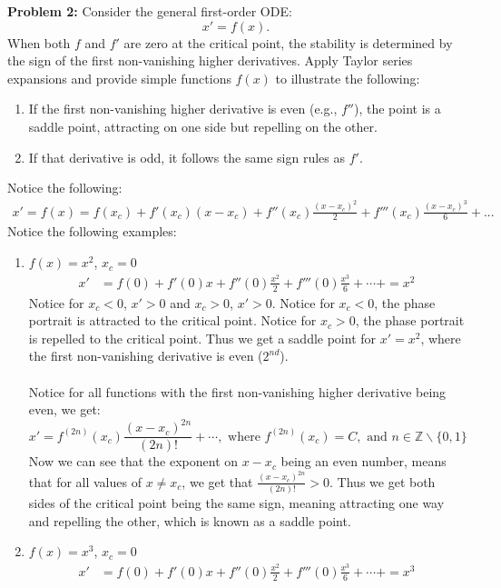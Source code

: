\documentclass[11pt]{article}
\newenvironment{problem}[1]{\textbf{Problem #1: }}{\newpage}
\begin{document}
	\begin{problem}{2}
		 Consider the general first-order ODE:
		 \[x' = f(x). \tag{2}\]
		 When both $f$ and $f'$ are zero at the critical point, the stability is determined by the sign of the first non-vanishing higher derivatives. Apply Taylor series expansions and provide simple functions $f(x)$ to illustrate the following:
		 \begin{enumerate}[label = (\alph*)]
		 	\item If the first non-vanishing higher derivative is even (e.g., $f''$), the point is a saddle point, attracting on one side but repelling on the other.
		 	\item If that derivative is odd, it follows the same sign rules as $f'$.
		 \end{enumerate}
	 	Notice the following:
	 	\begin{align*}
	 		x' = f(x) = f(x_c) + f'(x_c)(x-x_c) + f''(x_c)\frac{(x-x_c)^2}{2} + f'''(x_c)\frac{(x-x_c)^3}{6}+ ...
	 	\end{align*}
 		Notice the following examples:
 		\begin{enumerate}[label = (\alph*)]
 			\item $f(x) = x^2$, $x_c = 0$
 			\begin{align*}
 				x' &= f(0) + f'(0)x + f''(0)\frac{x^2}{2} + f'''(0)\frac{x^3}{6}+ \cdots + = x^2
 			\end{align*}
 			Notice for $x_c < 0$, $x' > 0$ and $x_c > 0$, $x' > 0$.  Notice for $x_c < 0$, the phase portrait is attracted to the critical point. Notice for $x_c > 0$, the phase portrait is repelled to the critical point.  Thus we get a saddle point for $x' = x^2$, where the first non-vanishing derivative is even ($2^{nd}$). 
 			\\ \\
 			Notice for all functions with the first non-vanishing higher derivative being even, we get:
 			\[x' = f^{(2n)}(x_c) \frac{(x-x_c)^{2n}}{(2n)!} + \cdots, \text{ where } f^{(2n)}(x_c) = C, \text{ and } n \in \mathbb{Z}\backslash\{0,1\} \]
 			Now we can see that the exponent on $x-x_c$ being an even number, means that for all values of $x \not= x_c$, we get that $\frac{(x-x_c)^{2n}}{(2n)!} > 0$.  Thus we get both sides of the critical point being the same sign, meaning attracting one way and repelling the other, which is known as a saddle point.
 			 \item $f(x) = x^3$, $x_c = 0$
 			\begin{align*}
 				x' &= f(0) + f'(0)x + f''(0)\frac{x^2}{2} + f'''(0)\frac{x^3}{6}+ \cdots + = x^3

\end{align*}
\end{enumerate}
\end{problem}
\end{document}
